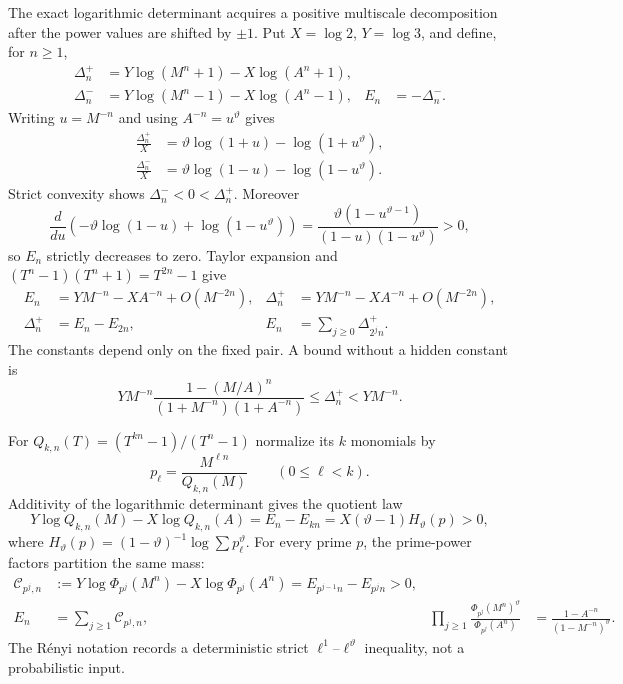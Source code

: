 \documentclass[11pt,oneside]{article}
\theoremstyle{definition}
\theoremstyle{remark}
\newcommand{\thetaq}{\vartheta}
\begin{document}
The exact logarithmic determinant acquires a positive multiscale decomposition after the
power values are shifted by $\pm1$.  Put $X=\log2$, $Y=\log3$, and define, for $n\ge1$,
\begin{align}
 \Delta_n^+&=Y\log(M^n+1)-X\log(A^n+1),\nonumber\\
 \Delta_n^-&=Y\log(M^n-1)-X\log(A^n-1),
 &E_n&=-\Delta_n^- .
 \label{crit:eq-shifted-defects}
\end{align}
Writing $u=M^{-n}$ and using $A^{-n}=u^{\thetaq}$ gives
\begin{align}
 \frac{\Delta_n^+}{X}
 &=\thetaq\log(1+u)-\log(1+u^{\thetaq}),\nonumber\\
 \frac{\Delta_n^-}{X}
 &=\thetaq\log(1-u)-\log(1-u^{\thetaq}).
 \label{crit:eq-shifted-u}
\end{align}
Strict convexity shows $\Delta_n^-<0<\Delta_n^+$.  Moreover
\[
 \frac{d}{du}\left(-\thetaq\log(1-u)+\log(1-u^{\thetaq})\right)
 =\frac{\thetaq(1-u^{\thetaq-1})}{(1-u)(1-u^{\thetaq})}>0,
\]
so $E_n$ strictly decreases to zero.  Taylor expansion and
$(T^n-1)(T^n+1)=T^{2n}-1$ give
\begin{align}
 E_n&=YM^{-n}-XA^{-n}+O(M^{-2n}),
 &\Delta_n^+&=YM^{-n}-XA^{-n}+O(M^{-2n}),\nonumber\\
 \Delta_n^+&=E_n-E_{2n},
 &E_n&=\sum_{j\ge0}\Delta_{2^jn}^+.
 \label{crit:eq-dyadic-defect-cascade}
\end{align}
The constants depend only on the fixed pair.  A bound without a hidden constant is
\begin{equation}
 YM^{-n}\frac{1-(M/A)^n}{(1+M^{-n})(1+A^{-n})}
 \le \Delta_n^+<YM^{-n}.
 \label{crit:eq-plus-defect-bound}
\end{equation}

For $Q_{k,n}(T)=(T^{kn}-1)/(T^n-1)$ normalize its $k$ monomials by
\[
 p_\ell=\frac{M^{\ell n}}{Q_{k,n}(M)}\qquad(0\le\ell<k).
\]
Additivity of the logarithmic determinant gives the quotient law
\begin{equation}
 Y\log Q_{k,n}(M)-X\log Q_{k,n}(A)
 =E_n-E_{kn}
 =X(\thetaq-1)H_{\thetaq}(p)>0,
 \label{crit:eq-renyi-quotient}
\end{equation}
where $H_{\thetaq}(p)=(1-\thetaq)^{-1}\log\sum p_\ell^{\thetaq}$.
For every prime $p$, the prime-power factors partition the same mass:
\begin{align}
 \mathcal C_{p^j,n}
 &:=
 Y\log\Phi_{p^j}(M^n)-X\log\Phi_{p^j}(A^n)
 =E_{p^{j-1}n}-E_{p^jn}>0,\nonumber\\
 E_n&=\sum_{j\ge1}\mathcal C_{p^j,n},
 &
 \prod_{j\ge1}
 \frac{\Phi_{p^j}(M^n)^{\thetaq}}{\Phi_{p^j}(A^n)}
 &=\frac{1-A^{-n}}{(1-M^{-n})^{\thetaq}}.
 \label{crit:eq-cyclotomic-partition}
\end{align}
The R\'enyi notation records a deterministic strict
$\ell^1$--$\ell^{\thetaq}$ inequality, not a probabilistic input.
\end{document}
